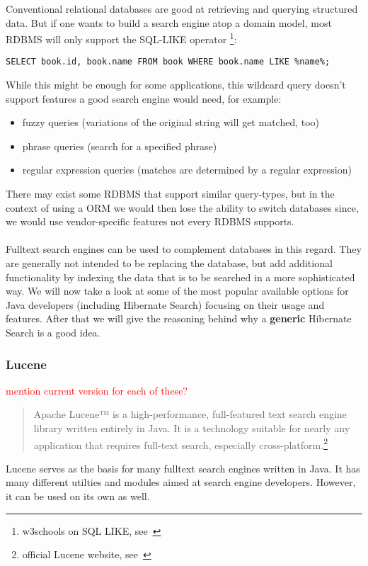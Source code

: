Conventional relational databases are good at retrieving and querying structured data. But if one wants to build a search engine atop a domain model, most RDBMS will only support the SQL-LIKE operator \footnote{w3schools on SQL LIKE, see~\cite{sql_like_w3schools}}:\\

\lstset{language=sql}
\begin{lstlisting}[frame=htrbl, caption={SQL LIKE operator in use}, label={lst:result2}]
SELECT book.id, book.name FROM book WHERE book.name LIKE %name%;
\end{lstlisting}
While this might be enough for some applications, this wildcard query doesn't support features a good search engine would need, for example:

\begin{itemize}
	\item fuzzy queries (variations of the original string will get matched, too)
	\item phrase queries (search for a specified phrase)
	\item regular expression queries (matches are determined by a regular expression)
\end{itemize}
There may exist some RDBMS that support similar query-types, but in the context of using a ORM we would then lose the ability to switch databases since, we would use vendor-specific features not every RDBMS supports.
\\\\
Fulltext search engines can be used to complement databases in this regard. They are generally not intended to be replacing the database, but add additional functionality by indexing the data that is to be searched in a more sophisticated way. We will now take a look at some of the most popular available options for Java developers (including Hibernate Search) focusing on their usage and features. After that we will give the reasoning behind why a \textbf{generic} Hibernate Search is a good idea.

\pagebreak

\subsubsection{Lucene}

\textcolor{red}{mention current version for each of these?}

\begin{quote}
	Apache Lucene™ is a high-performance, full-featured text search engine library written entirely in Java. It is a technology suitable for nearly any application that requires full-text search, especially cross-platform.\footnote{official Lucene website, see~\cite{lucene_apache_org}}
\end{quote}
Lucene serves as the basis for many fulltext search engines written in Java. It has many different utilties and modules aimed at search engine developers. However, it can be used on its own as well.

